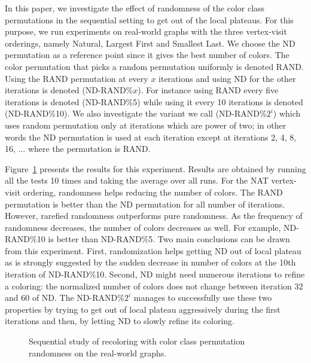 \documentclass{article}
\begin{document}
In this paper, we investigate the effect of randomness of the
color class permutations in the sequential setting to get out of the
local plateaus. For this purpose, we
run experiments on real-world graphs with the three vertex-visit orderings,
namely Natural, Largest First and Smallest Last. We choose the ND
permutation as a reference point since it gives the best number of
colors. The color permutation that picks a random permutation uniformly is denoted
RAND. Using the RAND permutation at every $x$ iterations and using ND
for the other iterations is denoted (ND-RAND\%$x$). For instance using RAND
every five iterations is denoted (ND-RAND\%5) while using it every 10
iterations is denoted (ND-RAND\%10). We also investigate the variant
we call (ND-RAND\%$2^i$) which uses random permutation only at iterations
which are power of two; in other words the ND permutation is used at
each iteration except at iterations 2, 4, 8, 16, ... where the
permutation is RAND.

Figure~\ref{fig:random_perm} presents the results for this
experiment. Results are obtained by running all the tests 10
times and taking the average over all runs. For the NAT vertex-visit ordering, randomness
helps reducing the number of colors. The RAND permutation is better
than the ND permutation for all number of iterations. However,
rarefied randomness outperforms pure randomness. As the frequency
of randomness decreases, the number of colors decreases as
well. For example, ND-RAND\%10 is better than ND-RAND\%5. Two main
conclusions can be drawn from this experiment. First, randomization
helps getting ND out of local plateau as is strongly suggested by the
sudden decrease in number of colors at the 10th iteration of
ND-RAND\%10. Second, ND might need numerous iterations to refine a
coloring: the normalized number of colors does not change between
iteration 32 and 60 of ND. The
ND-RAND\%$2^i$ manages to successfully use these two properties by
trying to get out of local plateau aggressively during the first
iterations and then, by letting ND to slowly refine its coloring.

\begin{figure}[bt]
  \centering
  \caption{Sequential study of recoloring with color class permutation randomness on the real-world graphs.}
  \label{fig:random_perm}
\end{figure}
\end{document}
